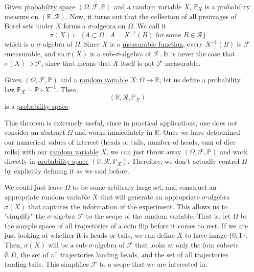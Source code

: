   \begin{theorem}
    \label{thm:sigma-algebra-generated-by-random-variable-x}
    Given \hyperref[def:probability-space]{probability space} $(\Omega, \mathcal{F}, \mathbb{P})$ and a random variable $X$, $\mathbb{P}_X$ is a probability measure on $(\mathbb{R}, \mathcal{R})$. Now, it turns out that the collection of all preimages of Borel sets under $X$ forms a $\sigma$-algebra on $\Omega$. We call it 
    \begin{equation}
      \sigma(X) \coloneqq \big\{ A \subset \Omega \mid A = X^{-1}(B) \text{ for some } B \in \mathcal{R} \big\}
    \end{equation}
    which is a $\sigma$-algebra of $\Omega$. Since $X$ is a \hyperref[mt-def:measurable-function]{measurable function}, every $X^{-1}(B)$ is $\mathcal{F}$-measurable, and so $\sigma(X)$ is a sub-$\sigma$-algebra of $\mathcal{F}$. It is never the case that $\sigma(X) \supset \mathcal{F}$, since that means that $X$ itself is not $\mathcal{F}$-measurable. 
  \end{theorem}

  \begin{theorem}
    \label{thm:pushforward}
    Given $(\Omega, \mathcal{F}, \mathbb{P})$ and a \hyperref[def:random-variable]{random variable} $X: \Omega \rightarrow \mathbb{R}$, let us define a probability law $\mathbb{P}_X = \mathbb{P} \circ X^{-1}$. Then, 
    \begin{equation}
      (\mathbb{R}, \mathcal{R}, \mathbb{P}_X)
    \end{equation}
    is a \hyperref[def:probability-space]{probability space}. 
  \end{theorem}

  This theorem is extremely useful, since in practical applications, one does not consider an abstract $\Omega$ and works immediately in $\mathbb{R}$. Once we have determined our numerical values of interest (heads or tails, number of heads, sum of dice rolls) with our \hyperref[def:random-variable]{random variable} $X$, we can just throw away $(\Omega, \mathcal{F}, \mathbb{P})$ and work directly in \hyperref[def:probability-space]{probability space} $(\mathbb{R}, \mathcal{R}, \mathbb{P}_X)$. Therefore, we don't actually control $\Omega$ by explicitly defining it as we said before. 

  We could just leave $\Omega$ to be some arbitrary large set, and construct an appropriate random variable $X$ that will generate an appropriate $\sigma$-algebra $\sigma(X)$ that captures the information of the experiment. This allows us to "simplify" the $\sigma$-algebra $\mathcal{F}$ to the scope of the random variable. That is, let $\Omega$ be the sample space of all trajectories of a coin flip before it comes to rest. If we are just looking at whether it is heads or tails, we can define $X$ to have image $\{0, 1\}$. Then, $\sigma(X)$ will be a sub-$\sigma$-algebra of $\mathcal{F}$ that looks at only the four subsets $\emptyset, \Omega$, the set of all trajectories landing heads, and the set of all trajectories landing tails. This simplifies $\mathcal{F}$ to a scope that we are interested in. 

